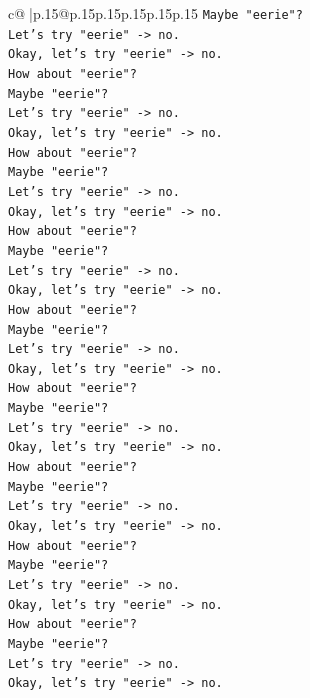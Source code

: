 \documentclass{article}
\begin{document}
{\begin{supertabular}{c@{$\;$}|p{.15\linewidth}@{}p{.15\linewidth}p{.15\linewidth}p{.15\linewidth}p{.15\linewidth}p{.15\linewidth}}
{{{\texttt{Maybe "eerie"?} \\
\texttt{Let's try "eerie" {-}> no.} \\
\texttt{Okay, let's try "eerie" {-}> no.} \\
\texttt{How about "eerie"?} \\
\texttt{Maybe "eerie"?} \\
\texttt{Let's try "eerie" {-}> no.} \\
\texttt{Okay, let's try "eerie" {-}> no.} \\
\texttt{How about "eerie"?} \\
\texttt{Maybe "eerie"?} \\
\texttt{Let's try "eerie" {-}> no.} \\
\texttt{Okay, let's try "eerie" {-}> no.} \\
\texttt{How about "eerie"?} \\
\texttt{Maybe "eerie"?} \\
\texttt{Let's try "eerie" {-}> no.} \\
\texttt{Okay, let's try "eerie" {-}> no.} \\
\texttt{How about "eerie"?} \\
\texttt{Maybe "eerie"?} \\
\texttt{Let's try "eerie" {-}> no.} \\
\texttt{Okay, let's try "eerie" {-}> no.} \\
\texttt{How about "eerie"?} \\
\texttt{Maybe "eerie"?} \\
\texttt{Let's try "eerie" {-}> no.} \\
\texttt{Okay, let's try "eerie" {-}> no.} \\
\texttt{How about "eerie"?} \\
\texttt{Maybe "eerie"?} \\
\texttt{Let's try "eerie" {-}> no.} \\
\texttt{Okay, let's try "eerie" {-}> no.} \\
\texttt{How about "eerie"?} \\
\texttt{Maybe "eerie"?} \\
\texttt{Let's try "eerie" {-}> no.} \\
\texttt{Okay, let's try "eerie" {-}> no.} \\
\texttt{How about "eerie"?} \\
\texttt{Maybe "eerie"?} \\
\texttt{Let's try "eerie" {-}> no.} \\
\texttt{Okay, let's try "eerie" {-}> no.} \\
}}}
\end{supertabular}}
\end{document}
